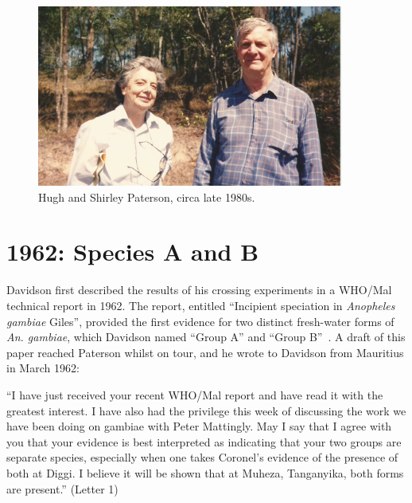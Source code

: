 \documentclass[a4paper,11pt,abstracton,hidelinks]{scrartcl}
\begin{document}
\begin{figure}[t]
\centering
\includegraphics[width=0.9\textwidth]{artwork/chapter2/Hugh_and_Shirley_Paterson_Brisbane.jpg}
\caption{Hugh and Shirley Paterson, circa late 1980s.}
\label{fig:patersons}
\end{figure}


\section{1962: Species A and B}\label{sec:1962}


Davidson first described the results of his crossing experiments in a WHO/Mal technical report in 1962.
%
The report, entitled ``Incipient speciation in \textit{Anopheles gambiae} Giles'', 
provided the first evidence for two distinct fresh-water forms of \textit{An. gambiae}, which Davidson named ``Group A'' and ``Group B''~\parencite{Davidson1962a}.
%
A draft of this paper reached Paterson whilst on tour, and he wrote to Davidson from Mauritius in March 1962:


\begin{displayquote}
``I have just received your recent WHO/Mal report and have read it with the greatest interest. I have also had the privilege this week of discussing the work we have been doing on gambiae with Peter Mattingly. May I say that I agree with you that your evidence is best interpreted as indicating that your two groups are separate species, especially when one takes Coronel's evidence of the presence of both at Diggi. I believe it will be shown that at Muheza, Tanganyika, both forms are present.'' (Letter 1)
\end{displayquote}
\end{document}
